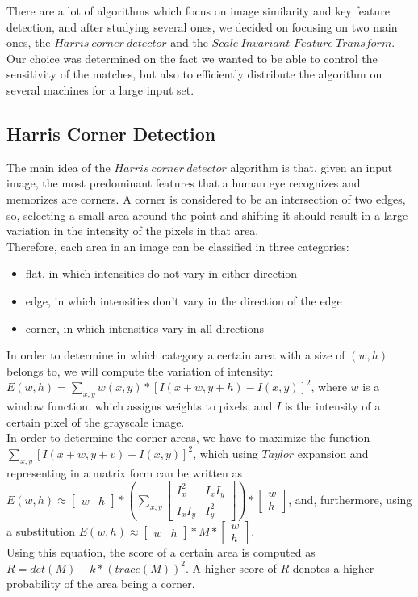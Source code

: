 \documentclass[conference]{IEEEtran}
\begin{document}
There are a lot of algorithms which focus on image similarity and key feature detection, and after studying several ones, we decided on focusing on two main ones, the $Harris\ corner\ detector$ and the $Scale\ Invariant$ $Feature\ Transform$. Our choice was determined on the fact we wanted to be able to control the sensitivity of the matches, but also to efficiently distribute the algorithm on several machines for a large input set. \\


\subsection{Harris Corner Detection}

The main idea of the $Harris\ corner\ detector$ algorithm is that, given an input image, the most predominant features that a human eye recognizes and memorizes are corners. A corner is considered to be an intersection of two edges, so, selecting a small area around the point and shifting it should result in a large variation in the intensity of the pixels in that area. \\
Therefore, each area in an image can be classified in three categories:
\begin{itemize}
	\item flat, in which intensities do not vary in either direction
	\item edge, in which intensities don't vary in the direction of the edge
	\item corner, in which intensities vary in all directions
\end{itemize}

In order to determine in which category a certain area with a size of $(w, h)$ belongs to, we will compute the variation of intensity: $E(w, h) = \sum_{x, y} w(x, y) * [I(x + w, y + h) - I(x, y)]^2$, where $w$ is a window function, which assigns weights to pixels, and $I$ is the intensity of a certain pixel of the grayscale image.\\
In order to determine the corner areas, we have to maximize the function $\sum_{x, y}[I(x + w, y + v) - I(x, y)]^2$, which using $Taylor$ expansion and representing in a matrix form can be written as
$E(w, h) \approx
\begin{bmatrix}
w & h
\end{bmatrix} * 
\left(\sum_{x, y}
\begin{bmatrix}
I_x^2 & I_xI_y\\
I_xI_y & I_y^2
\end{bmatrix}
\right) *
\begin{bmatrix}
w \\
h
\end{bmatrix}$, and, furthermore, using a substitution
$E(w, h) \approx
\begin{bmatrix}
w & h
\end{bmatrix} * 
M *
\begin{bmatrix}
w \\
h
\end{bmatrix}$.\\
Using this equation, the score of a certain area is computed as $R = det(M) - k * (trace(M))^2$. A higher score of $R$ denotes a higher probability of the area being a corner.
\end{document}
